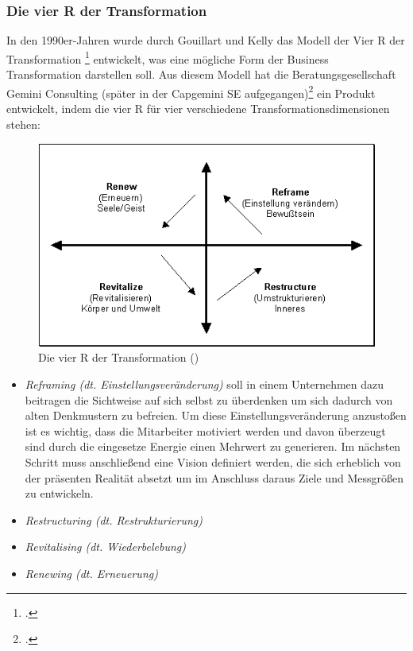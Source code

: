 \subsubsection{Die vier R der Transformation}
In den 1990er-Jahren wurde durch Gouillart und Kelly das Modell der \glqq{}Vier R der Transformation\grqq{} \footcite[Vgl.][]{4r-modell} entwickelt, was eine mögliche Form der Business Transformation darstellen soll. Aus diesem Modell hat die Beratungsgesellschaft Gemini Consulting (später in der Capgemini SE aufgegangen)\footcite[Vgl.][]{gemini-died} ein Produkt entwickelt, indem die vier R für vier verschiedene Transformationsdimensionen stehen:\\
\begin{figure}[h]
    \centering
    \includegraphics[scale=0.5]{Bilder/businesstransformationManagementportal.png}
    \caption[Die vier R der Transformation]{Die vier R der Transformation (\cite[][]{4r-modell})}
\end{figure}
\begin{itemize}
    \item[] \emph{Reframing (dt. Einstellungsveränderung)} soll in einem Unternehmen dazu beitragen die Sichtweise auf sich selbst zu überdenken um sich dadurch von alten Denkmustern zu befreien. Um diese Einstellungsveränderung anzustoßen ist es wichtig, dass die Mitarbeiter motiviert werden und davon überzeugt sind durch die eingesetze Energie einen Mehrwert zu generieren. Im nächsten Schritt muss anschließend eine Vision definiert werden, die sich erheblich von der präsenten Realität absetzt um im Anschluss daraus Ziele und Messgrößen zu entwickeln. 
    \item[] \emph{Restructuring (dt. Restrukturierung)} 
    \item[] \emph{Revitalising (dt. Wiederbelebung)}
    \item[] \emph{Renewing (dt. Erneuerung)}
\end{itemize}

